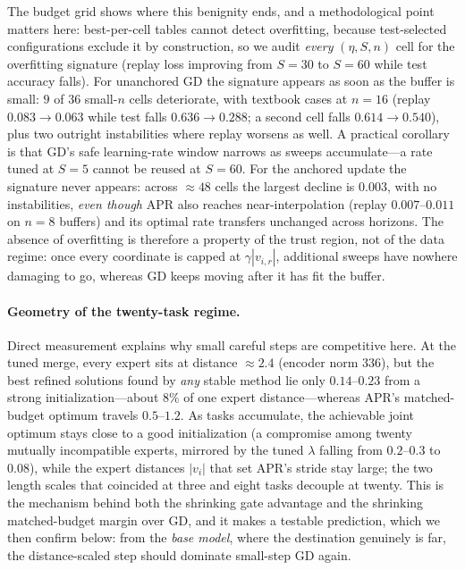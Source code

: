 \documentclass[11pt]{article}
\begin{document}
The budget grid shows where this benignity ends, and a methodological point matters here: best-per-cell tables cannot detect overfitting, because test-selected configurations exclude it by construction, so we audit \emph{every} $(\eta, S, n)$ cell for the overfitting signature (replay loss improving from $S=30$ to $S=60$ while test accuracy falls). For unanchored GD the signature appears as soon as the buffer is small: $9$ of $36$ small-$n$ cells deteriorate, with textbook cases at $n=16$ (replay $0.083\!\to\!0.063$ while test falls $0.636\!\to\!0.288$; a second cell falls $0.614\!\to\!0.540$), plus two outright instabilities where replay worsens as well. A practical corollary is that GD's safe learning-rate window narrows as sweeps accumulate---a rate tuned at $S=5$ cannot be reused at $S=60$. For the anchored update the signature never appears: across ${\approx}48$ cells the largest decline is $0.003$, with no instabilities, \emph{even though} APR also reaches near-interpolation (replay $0.007$--$0.011$ on $n=8$ buffers) and its optimal rate transfers unchanged across horizons. The absence of overfitting is therefore a property of the trust region, not of the data regime: once every coordinate is capped at $\gamma|v_{i,r}|$, additional sweeps have nowhere damaging to go, whereas GD keeps moving after it has fit the buffer.

\paragraph{Geometry of the twenty-task regime.}
Direct measurement explains why small careful steps are competitive here. At the tuned merge, every expert sits at distance ${\approx}2.4$ (encoder norm $336$), but the best refined solutions found by \emph{any} stable method lie only $0.14$--$0.23$ from a strong initialization---about $8\%$ of one expert distance---whereas APR's matched-budget optimum travels $0.5$--$1.2$. As tasks accumulate, the achievable joint optimum stays close to a good initialization (a compromise among twenty mutually incompatible experts, mirrored by the tuned $\lambda$ falling from $0.2$--$0.3$ to $0.08$), while the expert distances $|v_i|$ that set APR's stride stay large; the two length scales that coincided at three and eight tasks decouple at twenty. This is the mechanism behind both the shrinking gate advantage and the shrinking matched-budget margin over GD, and it makes a testable prediction, which we then confirm below: from the \emph{base model}, where the destination genuinely is far, the distance-scaled step should dominate small-step GD again.
\end{document}
